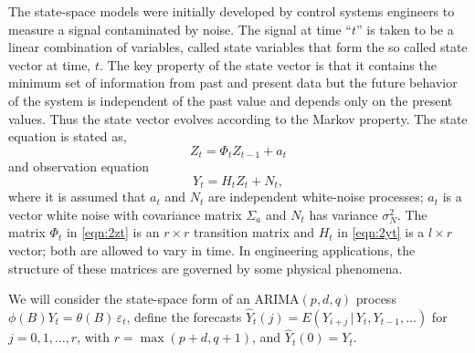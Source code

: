 The state-space models were initially developed by control systems engineers to measure a signal contaminated by noise. The signal at time ``$t$'' is taken to be a linear combination of variables, called state variables that form the so called state vector at time, $t$. The key property of the state vector is that it contains the minimum set of information from past and present data but the future behavior of the system is independent of the past value and depends only on the present values. Thus the state vector evolves according to the Markov property. The state equation is stated as,
	\begin{equation} \label{eqn:2zt}
	Z_t = \Phi_tZ_{t-1} + a_t
	\end{equation}
and observation equation
	\begin{equation} \label{eqn:2yt}
	Y_t = H_tZ_t + N_t,
	\end{equation}
where it is assumed that $a_t$ and $N_t$ are independent white-noise processes; $a_t$ is a vector white noise with covariance matrix $\Sigma_a$ and $N_t$ has variance $\sigma_N^2$. The matrix $\Phi_t$ in \eqref{eqn:2zt} is an $r \times r$ transition matrix and $H_t$ in \eqref{eqn:2yt} is a $l \times r$ vector; both are allowed to vary in time. In engineering applications, the structure of these matrices are governed by some physical phenomena. 


We will consider the state-space form of an ARIMA$(p,d,q)$ process $\phi(B)Y_t = \theta(B)\,\varepsilon_t$, define the forecasts $\hat{Y}_t(j) = E(Y_{i+j}\,|\,Y_t,Y_{t-1},...)$ for $j= 0,1,\ldots,r$, with $r= \max(p+d,q+1)$, and $\hat{Y}_t(0) = Y_t$.


